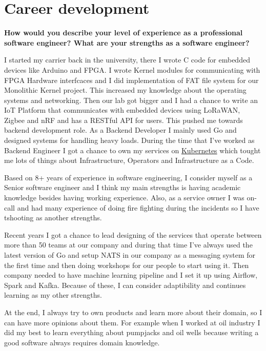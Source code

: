 \tableofcontents

\section{Career development}

\noindent
\textbf{How would you describe your level of experience as a professional software engineer?
What are your strengths as a software engineer?}

I started my carrier back in the university, there I wrote C code for embedded devices like Arduino and FPGA.
I wrote Kernel modules for communicating with FPGA Hardware interfcaces and I did implementation of FAT file system
for our Monolithic Kernel project.
This increased my knowledge about the operating systems and networking. Then our lab got bigger and I had a chance
to write an IoT Platform that communicates with embedded devices using LoRaWAN, Zigbee and nRF and has a RESTful
API for users. This pushed me towards backend development role. As a Backend Developer I mainly used Go and designed
systems for handling heavy loads. During the time that I've worked as Backend Engineer I got a chance to own my services
on \href{https://kubernetes.io/}{Kubernetes} which tought me lots of things about Infrastructure,
Operators and Infrastructure as a Code.

Based on 8+ years of experience in software engineering, I consider myself as a Senior software engineer and
I think my main strengths is having academic knowledge besides having working experience.
Also, as a service owner I was on-call and had many experience of doing fire fighting during the incidents so I have
tshooting as another strengths.

Recent years I got a chance to lead designing of the services that operate between more than 50 teams at our company and
during that time I've always used the latest version of Go and setup NATS in our company as a messaging system
for the first time and then doing workshops for our people to start using it. Then company needed to have machine
learning pipeline and I set it up using Airflow, Spark and Kafka. Because of these, I can consider adaptibility and
continues learning as my other strengths.

At the end, I always try to own products and learn more about their domain, so I can have more opinions about them.
For example when I worked at oil industry I did my best to learn everything about pumpjacks and oil wells because
writing a good software always requires domain knowledge.

